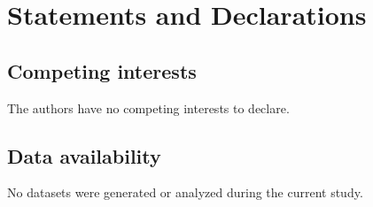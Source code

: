 \section*{Statements and Declarations}

\subsection*{Competing interests}

The authors have no competing interests to declare.

\subsection*{Data availability}

No datasets were generated or analyzed during the current study.
